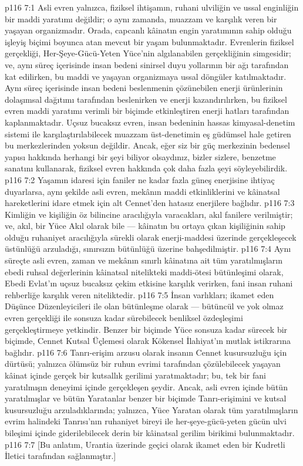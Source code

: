 \vs p116 7:1 Asli evren yalnızca, fiziksel ihtişamın, ruhani ulviliğin ve ussal enginliğin bir maddi yaratımı değildir; o aynı zamanda, muazzam ve karşılık veren bir yaşayan organizmadır. Orada, capcanlı kâinatın engin yaratımının sahip olduğu işleyiş biçimi boyunca atan mevcut bir yaşam bulunmaktadır. Evrenlerin fiziksel gerçekliği, Her\hyp{}Şeye\hyp{}Gücü\hyp{}Yeten Yüce’nin algılanabilen gerçekliğinin simgesidir; ve, aynı süreç içerisinde insan bedeni sinirsel duyu yollarının bir ağı tarafından kat edilirken, bu maddi ve yaşayan organizmaya ussal döngüler katılmaktadır. Aynı süreç içerisinde insan bedeni beslenmenin çözünebilen enerji ürünlerinin dolaşımsal dağıtımı tarafından beslenirken ve enerji kazandırılırken, bu fiziksel evren maddi yaratımı verimli bir biçimde etkinleştiren enerji hatları tarafından kaplanmaktadır. Uçsuz bucaksız evren, insan bedeninin hassas kimyasal\hyp{}denetim sistemi ile karşılaştırılabilecek muazzam üst\hyp{}denetimin eş güdümsel hale getiren bu merkezlerinden yoksun değildir. Ancak, eğer siz bir güç merkezinin bedensel yapısı hakkında herhangi bir şeyi biliyor olsaydınız, bizler sizlere, benzetme sanatını kullanarak, fiziksel evren hakkında çok daha fazla şeyi söyleyebilirdik.
\vs p116 7:2 Yaşamın idaresi için faniler ne kadar fazla güneş enerjisine ihtiyaç duyarlarsa, aynı şekilde asli evren, mekânın maddi etkinliklerini ve kâinatsal hareketlerini idare etmek için alt Cennet’den hatasız enerjilere bağlıdır.
\vs p116 7:3 Kimliğin ve kişiliğin öz bilincine aracılığıyla varacakları, akıl fanilere verilmiştir; ve, akıl, bir Yüce Akıl olarak bile --- kâinatın bu ortaya çıkan kişiliğinin sahip olduğu ruhaniyet aracılığıyla sürekli olarak enerji\hyp{}maddesi üzerinde gerçekleşecek üstünlüğü arzuladığı, sınırsızın bütünlüğü üzerine bahşedilmiştir.
\vs p116 7:4 Aynı süreçte asli evren, zaman ve mekânın sınırlı kâinatına ait tüm yaratılmışların ebedi ruhsal değerlerinin kâinatsal nitelikteki maddi\hyp{}ötesi bütünleşimi olarak, Ebedi Evlat’ın uçsuz bucaksız çekim etkisine karşılık verirken, fani insan ruhani rehberliğe karşılık veren niteliktedir.
\vs p116 7:5 İnsan varlıkları; ikamet eden Düşünce Düzenleyicileri ile olan bütünleşme olarak --- bütüncül ve yok olmaz evren gerçekliği ile sonsuza kadar sürebilecek benliksel özdeşleşimi gerçekleştirmeye yetkindir. Benzer bir biçimde Yüce sonsuza kadar sürecek bir biçimde, Cennet Kutsal Üçlemesi olarak Kökensel İlahiyat’ın mutlak istikrarına bağlıdır.
\vs p116 7:6 Tanrı\hyp{}erişim arzusu olarak insanın Cennet kusursuzluğu için dürtüsü; yalnızca ölümsüz bir ruhun evrimi tarafından çözülebilecek yaşayan kâinat içinde gerçek bir kutsallık gerilimi yaratmaktadır; bu, tek bir fani yaratılmışın deneyimi içinde gerçekleşen şeydir. Ancak, asli evren içinde bütün yaratılmışlar ve bütün Yaratanlar benzer bir biçimde Tanrı\hyp{}erişimini ve kutsal kusursuzluğu arzuladıklarında; yalnızca, Yüce Yaratan olarak tüm yaratılmışların evrim halindeki Tanrısı’nın ruhaniyet bireyi ile her\hyp{}şeye\hyp{}gücü\hyp{}yeten gücün ulvi bileşimi içinde giderilebilecek derin bir kâinatsal gerilim birikimi bulunmaktadır.
\vs p116 7:7 [Bu anlatım, Urantia üzerinde geçici olarak ikamet eden bir Kudretli İletici tarafından sağlanmıştır.]
